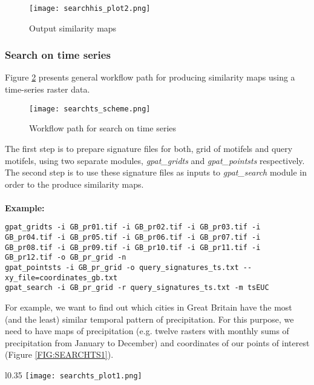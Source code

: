 \begin{figure}[H]
	\centering
	\texttt{[image: searchhis\_plot2.png]}
	\caption{Output similarity maps}
	\label{FIG:SEARCH2}
\end{figure}

\FloatBarrier

\subsubsection{Search on time series}
Figure \ref{FIG:SEARCHTS} presents general workflow path for producing similarity maps using a time-series raster data. 

\begin{figure}[H]
	\centering
	\texttt{[image: searchts\_scheme.png]}
	\caption{Workflow path for search on time series}
	\label{FIG:SEARCHTS}
\end{figure}

The first step is to prepare signature files for both, grid of motifels and query motifels, using two separate modules, {\it gpat\_gridts} and {\it gpat\_pointsts} respectively. 
The second step is to use these signature files as inputs to {\it gpat\_search} module in order to the produce similarity maps.\\\\

{\bf Example:}

\begin{minipage}{\linewidth}
\begin{lstlisting}
gpat_gridts -i GB_pr01.tif -i GB_pr02.tif -i GB_pr03.tif -i GB_pr04.tif -i GB_pr05.tif -i GB_pr06.tif -i GB_pr07.tif -i GB_pr08.tif -i GB_pr09.tif -i GB_pr10.tif -i GB_pr11.tif -i GB_pr12.tif -o GB_pr_grid -n
gpat_pointsts -i GB_pr_grid -o query_signatures_ts.txt --xy_file=coordinates_gb.txt
gpat_search -i GB_pr_grid -r query_signatures_ts.txt -m tsEUC
\end{lstlisting}
\end{minipage}

For example, we want to find out which cities in Great Britain have the most (and the least) similar temporal pattern of precipitation. 
For this purpose, we need to have maps of precipitation (e.g. twelve rasters with monthly sums of precipitation from January to December) and coordinates of our points of interest (Figure \ref{FIG:SEARCHTS1}).

\newpage

\begin{wrapfigure}{l}{0.35\textwidth}
	\texttt{[image: searchts\_plot1.png]}
	\caption{Location of the points of interest}
	\label{FIG:SEARCHTS1}
\end{wrapfigure}

